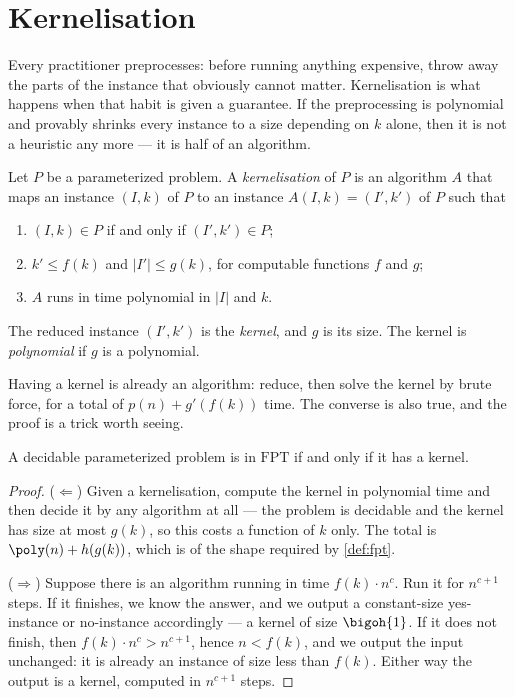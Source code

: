\section{Kernelisation}
\label{sec:fpt-kernelisation}

Every practitioner preprocesses: before running anything expensive, throw away
the parts of the instance that obviously cannot matter. Kernelisation is what
happens when that habit is given a guarantee. If the preprocessing is
polynomial and provably shrinks every instance to a size depending on $k$ alone,
then it is not a heuristic any more --- it is half of an algorithm.

\begin{definition}[Kernel]\label{def:kernel}
Let $P$ be a parameterized problem. A \emph{kernelisation} of $P$ is an
algorithm $A$ that maps an instance $(I,k)$ of $P$ to an instance
$A(I,k) = (I',k')$ of $P$ such that
\begin{enumerate}[label=(\roman*),leftmargin=*,nosep]
  \item $(I,k) \in P$ if and only if $(I',k') \in P$;
  \item $k' \le f(k)$ and $|I'| \le g(k)$, for computable functions $f$ and $g$;
  \item $A$ runs in time polynomial in $|I|$ and $k$.
\end{enumerate}
The reduced instance $(I',k')$ is the \emph{kernel}, and $g$ is its size. The
kernel is \emph{polynomial} if $g$ is a polynomial.
\end{definition}

Having a kernel is already an algorithm: reduce, then solve the kernel by brute
force, for a total of $p(n) + g'(f(k))$ time. The converse is also true, and
the proof is a trick worth seeing.

\begin{theorem}\label{thm:kernel-iff-fpt}
A decidable parameterized problem is in $\mathrm{FPT}$ if and only if it has a
kernel.
\end{theorem}

\begin{proof}
($\Leftarrow$) Given a kernelisation, compute the kernel in polynomial time and
then decide it by any algorithm at all --- the problem is decidable and the
kernel has size at most $g(k)$, so this costs a function of $k$ only. The total
is $\poly(n) + h(g(k))$, which is of the shape required by \cref{def:fpt}.

($\Rightarrow$) Suppose there is an algorithm running in time $f(k)\cdot n^{c}$.
Run it for $n^{c+1}$ steps. If it finishes, we know the answer, and we output a
constant-size yes-instance or no-instance accordingly --- a kernel of size
$\bigoh{1}$. If it does not finish, then $f(k)\cdot n^{c} > n^{c+1}$, hence
$n < f(k)$, and we output the input unchanged: it is already an instance of size
less than $f(k)$. Either way the output is a kernel, computed in $n^{c+1}$
steps.
\end{proof}


